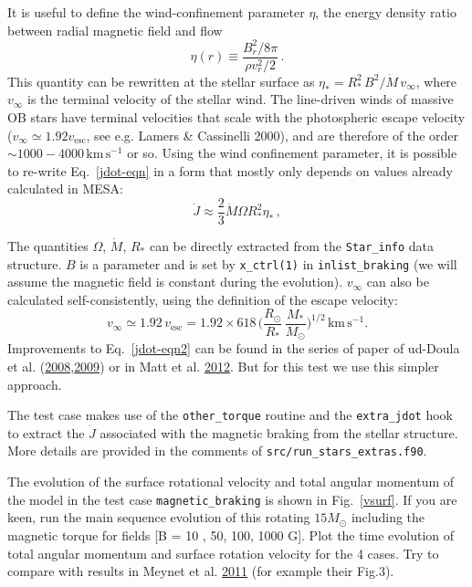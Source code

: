 \documentclass{article}
\newcommand{\unitstyle}[1]{\ensuremath{\mathrm{#1}}}
\newcommand{\second}{\unitstyle{s}}
\newcommand{\Msun}{\ensuremath{M_\odot}}
\newcommand{\Rsun}{\ensuremath{R_{\odot}}}
\newcommand{\kms}{\ensuremath{\mathrm{km} \,\second^{-1}}}
\begin{document}
It is useful to define the wind-confinement parameter $\eta$, the energy density ratio between radial magnetic field and flow
\begin{equation}\label{eta-eqn}
\eta(r) \equiv \frac{B_{r}^{2}/8\pi}{\rho v_{r}^{2}/2}
\, .
\end{equation}
This quantity can be rewritten at the stellar surface as $\eta_* = R_*^2\,B^2/\dot M\,v_\infty$,
where $v_\infty$ is the terminal velocity of the stellar wind. The line-driven winds of massive OB stars have 
terminal velocities that scale with the photospheric escape velocity ($v_\infty\simeq 1.92v_{\mathrm{esc}}$, see e.g. Lamers \& Cassinelli 2000), 
and are therefore of the order $\sim 1000-4000\,\kms$ or so. Using the wind confinement parameter,
it is possible to re-write Eq.~\ref{jdot-eqn} in a form that mostly only depends on values already calculated in MESA:
\begin{equation}\label{jdot-eqn2}
\dot J \approx \frac {2}{3} \dot M \Omega R_*^2 \eta_*\, ,
\end{equation}
 
The quantities  $\Omega$, $\dot M$, $R_*$ can be directly extracted from the \verb+Star_info+ data
structure. $B$ is a parameter and is set by  \verb+x_ctrl(1)+ in \texttt{inlist\_braking}  (we will  assume the magnetic field is constant during the evolution). $v_\infty$ can also be calculated self-consistently,
using the definition of the escape velocity: 
\begin{equation}
 v_\infty \simeq 1.92\,v_{\mathrm{esc}} = 1.92 \times 618 \,\bigg(\frac{\Rsun}{R_*}\,\frac{M_*}{\Msun}\bigg)^{1/2} \,\kms.
\label{vinf}
\end{equation}
Improvements to Eq.~\ref{jdot-eqn2} can be found in the series of
paper of ud-Doula et al. (\href{http://adsabs.harvard.edu/abs/2008MNRAS.385...97U}{2008},\href{http://adsabs.harvard.edu/abs/2009MNRAS.392.1022U}{2009}) 
or in Matt et al. \href{http://adsabs.harvard.edu/abs/2012ApJ...754L..26M}{2012}. But for this test we use this simpler approach.

The test case makes use of  the \texttt{other\_torque} routine and the \texttt{extra\_jdot} hook to extract the $\dot J$ associated with the magnetic braking from the stellar structure.
More details are provided in the comments of \texttt{src/run\_stars\_extras.f90}.

The evolution of the surface rotational velocity and total angular momentum of the model in the test case \texttt{magnetic\_braking} is shown in Fig.~\ref{vsurf}.
If you are keen,  run the main sequence evolution of this rotating $15\Msun$ 
including the magnetic torque for fields [B = 10 , 50, 100, 1000 G]. Plot the time evolution of total angular momentum 
and surface rotation velocity for the 4 cases. Try to compare with results in 
Meynet et al. \href{http://adsabs.harvard.edu/abs/2011A%26A...525L..11M}{2011}
 (for example their Fig.3). 
 
\end{document}
